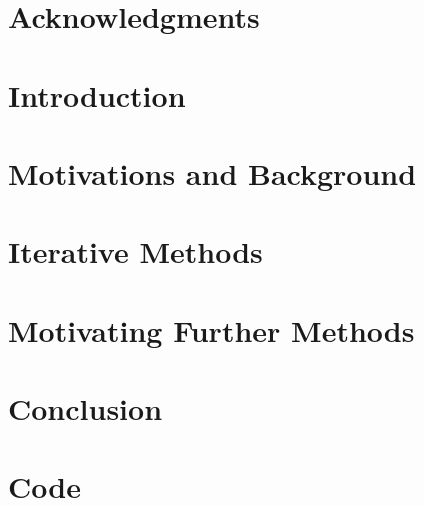 \documentclass[12pt,twoside]{report}
\begin{document}


\chapter*{Acknowledgments}


\tableofcontents

\chapter{Introduction}


\chapter{Motivations and Background}


\chapter{Iterative Methods}


\chapter{Motivating Further Methods}


\chapter{Conclusion}


\appendix
\chapter{Code}


\printbibliography 
\end{document}
